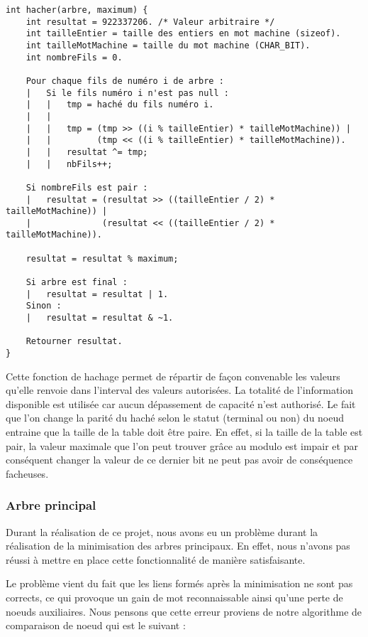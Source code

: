 \documentclass[15pt, a4paper]{article}
\begin{document}
\begin{verbatim}
int hacher(arbre, maximum) {
    int resultat = 922337206. /* Valeur arbitraire */
    int tailleEntier = taille des entiers en mot machine (sizeof).
    int tailleMotMachine = taille du mot machine (CHAR_BIT).
    int nombreFils = 0.

    Pour chaque fils de numéro i de arbre :
    |   Si le fils numéro i n'est pas null :
    |   |   tmp = haché du fils numéro i.
    |   |
    |   |   tmp = (tmp >> ((i % tailleEntier) * tailleMotMachine)) |
    |   |         (tmp << ((i % tailleEntier) * tailleMotMachine)).
    |   |   resultat ^= tmp;
    |   |   nbFils++;

    Si nombreFils est pair : 
    |   resultat = (resultat >> ((tailleEntier / 2) * tailleMotMachine)) |
    |              (resultat << ((tailleEntier / 2) * tailleMotMachine)).

    resultat = resultat % maximum;

    Si arbre est final :
    |   resultat = resultat | 1.
    Sinon :
    |   resultat = resultat & ~1.

    Retourner resultat.
}
\end{verbatim}

Cette fonction de hachage permet de répartir de façon convenable les valeurs 
qu'elle renvoie dans l'interval des valeurs autorisées. La totalité de 
l'information disponible est utilisée car aucun dépassement de capacité n'est 
authorisé. Le fait que l'on change la parité du haché selon le statut (terminal 
ou non) du noeud entraine que la taille de la table doit être paire. En effet,
si la taille de la table est pair, la valeur maximale que l'on peut trouver 
grâce au modulo est impair et par conséquent changer la valeur de ce dernier
bit ne peut pas avoir de conséquence facheuses.

\subsubsection{Arbre principal}

Durant la réalisation de ce projet, nous avons eu un problème durant la 
réalisation de la minimisation des arbres principaux. En effet, nous n'avons pas
réussi à mettre en place cette fonctionnalité de manière satisfaisante.

Le problème vient du fait que les liens formés après la minimisation ne sont pas 
corrects, ce qui provoque un gain de mot reconnaissable ainsi qu'une perte de noeuds
auxiliaires. Nous pensons que cette erreur proviens de notre algorithme de 
comparaison de noeud qui est le suivant :
\end{document}
